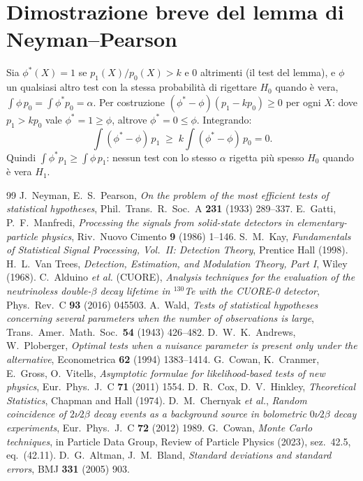 \documentclass[11pt,a4paper]{article}
\begin{document}
\section{Dimostrazione breve del lemma di Neyman--Pearson}
\label{app:NP}
Sia $\phi^*(X)=1$ se $p_1(X)/p_0(X)>k$ e $0$ altrimenti (il test del lemma), e $\phi$ un qualsiasi
altro test con la stessa probabilità di rigettare $H_0$ quando è vera,
$\int\phi\,p_0 = \int\phi^*p_0 = \alpha$. Per costruzione $(\phi^*-\phi)(p_1 - k p_0) \geq 0$ per
ogni $X$: dove $p_1 > k p_0$ vale $\phi^* = 1 \geq \phi$, altrove $\phi^* = 0 \leq \phi$.
Integrando:
\begin{equation*}
  \int(\phi^*-\phi)\,p_1 \;\geq\; k \int(\phi^*-\phi)\,p_0 = 0 .
\end{equation*}
Quindi $\int\phi^* p_1 \geq \int \phi\, p_1$: nessun test con lo stesso $\alpha$ rigetta più
spesso $H_0$ quando è vera $H_1$.

\begin{thebibliography}{99}
 J.~Neyman, E.~S.~Pearson, \emph{On the problem of the most efficient tests of
  statistical hypotheses}, Phil.\ Trans.\ R.\ Soc.\ A \textbf{231} (1933) 289--337.
 E.~Gatti, P.~F.~Manfredi, \emph{Processing the signals from solid-state
  detectors in elementary-particle physics}, Riv.\ Nuovo Cimento \textbf{9} (1986) 1--146.
 S.~M.~Kay, \emph{Fundamentals of Statistical Signal Processing, Vol.~II: Detection
  Theory}, Prentice Hall (1998).
 H.~L.~Van Trees, \emph{Detection, Estimation, and Modulation Theory, Part I},
  Wiley (1968).
 C.~Alduino \emph{et al.} (CUORE), \emph{Analysis techniques for the evaluation
  of the neutrinoless double-$\beta$ decay lifetime in $^{130}$Te with the CUORE-0 detector},
  Phys.\ Rev.\ C \textbf{93} (2016) 045503.
 A.~Wald, \emph{Tests of statistical hypotheses concerning several parameters when
  the number of observations is large}, Trans.\ Amer.\ Math.\ Soc.\ \textbf{54} (1943) 426--482.
 D.~W.~K.~Andrews, W.~Ploberger, \emph{Optimal tests when a nuisance
  parameter is present only under the alternative}, Econometrica \textbf{62} (1994) 1383--1414.
 G.~Cowan, K.~Cranmer, E.~Gross, O.~Vitells, \emph{Asymptotic formulae for
  likelihood-based tests of new physics}, Eur.\ Phys.\ J.\ C \textbf{71} (2011) 1554.
 D.~R.~Cox, D.~V.~Hinkley, \emph{Theoretical Statistics}, Chapman and Hall
  (1974).
 D.~M.~Chernyak \emph{et al.}, \emph{Random coincidence of $2\nu2\beta$ decay
  events as a background source in bolometric $0\nu2\beta$ decay experiments}, Eur.\ Phys.\ J.\ C
  \textbf{72} (2012) 1989.
 G.~Cowan, \emph{Monte Carlo techniques}, in Particle Data Group, Review of
  Particle Physics (2023), sez.~42.5, eq.~(42.11).
 D.~G.~Altman, J.~M.~Bland, \emph{Standard deviations and standard errors},
  BMJ \textbf{331} (2005) 903.
\end{thebibliography}
\end{document}
